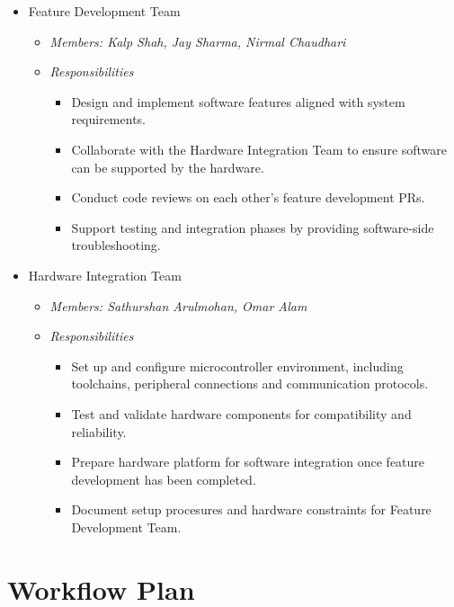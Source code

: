 \documentclass{article}
\begin{document}
\begin {itemize}
  \item Feature Development Team
  \begin{itemize}
    \item \textit{Members: Kalp Shah, Jay Sharma, Nirmal Chaudhari}
    \item \textit{Responsibilities}
      \begin{itemize}
        \item Design and implement software features aligned with system 
        requirements. 
        \item Collaborate with the Hardware Integration Team to ensure software 
        can be supported by the hardware. 
        \item Conduct code reviews on each other's feature development PRs. 
        \item Support testing and integration phases by providing software-side 
        troubleshooting. 
      \end{itemize} 
    \end{itemize}

  \item Hardware Integration Team
    \begin{itemize}
      \item \textit{Members: Sathurshan Arulmohan, Omar Alam}
      \item \textit{Responsibilities}
        \begin{itemize}
          \item Set up and configure microcontroller environment, including 
          toolchains, peripheral connections and communication protocols. 
          \item Test and validate hardware components for compatibility and 
          reliability. 
          \item Prepare hardware platform for software integration once feature 
          development has been completed. 
          \item Document setup procesures and hardware constraints for Feature 
          Development Team. 
        \end{itemize} 
    \end{itemize}


\end{itemize}

\section{Workflow Plan}
\end{document}
